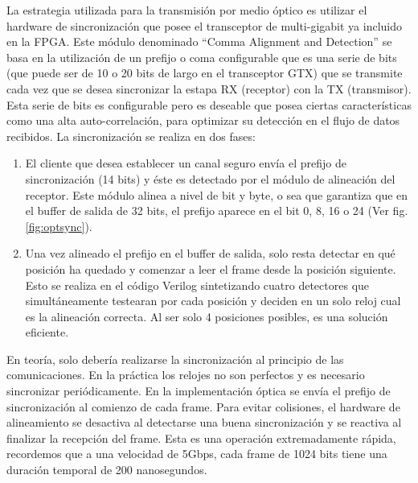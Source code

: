 La estrategia utilizada para la transmisión por medio óptico es utilizar el hardware de sincronización que posee el transceptor de multi-gigabit ya incluido en la FPGA. Este módulo \cite{ug198} denominado ``Comma Alignment and Detection'' se basa en la utilización de un prefijo o coma configurable que es una serie de bits (que puede ser de 10 o 20 bits de largo en el transceptor GTX) que se transmite cada vez que se desea sincronizar la estapa RX (receptor) con la TX (transmisor). Esta serie de bits es configurable pero es deseable que posea ciertas características como una alta auto-correlación, para optimizar su detección en el flujo de datos recibidos.
La sincronización se realiza en dos fases:
\begin{enumerate}
 \item El cliente que desea establecer un canal seguro envía el prefijo de sincronización (14 bits) y éste es detectado por el módulo de alineación del receptor. Este módulo alinea a nivel de bit y byte, o sea que garantiza que en el buffer de salida de 32 bits, el prefijo aparece en el bit 0, 8, 16 o 24 (Ver fig.\ref{fig:optsync}).
 \item Una vez alineado el prefijo en el buffer de salida, solo resta detectar en qué posición ha quedado y comenzar a leer el frame desde la posición siguiente. Esto se realiza en el código Verilog sintetizando cuatro detectores que simultáneamente testearan por cada posición y deciden en un solo reloj cual es la alineación correcta. Al ser solo 4 posiciones posibles, es una solución eficiente.
\end{enumerate}

En teoría, solo debería realizarse la sincronización al principio de las comunicaciones. En la práctica los relojes no son perfectos y es necesario sincronizar periódicamente. En la implementación óptica se envía el prefijo de sincronización al comienzo de cada frame.
Para evitar colisiones, el hardware de alineamiento se desactiva al detectarse una buena sincronización y se reactiva al finalizar la recepción del frame. Esta es una operación extremadamente rápida, recordemos que a una velocidad de 5Gbps, cada frame de 1024 bits tiene una duración temporal de 200 nanosegundos.

